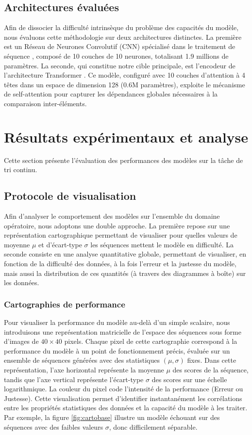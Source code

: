 \subsection{Architectures évaluées} 
Afin de dissocier la difficulté intrinsèque du problème des capacités du modèle, nous évaluons cette méthodologie sur deux architectures distinctes. La première est un Réseau de Neurones Convolutif (CNN) spécialisé dans le traitement de séquence \cite{kalchbrenner_neural_2017} , composé de 10 couches de 10 neurones, totalisant 1.9 millions de paramètres. La seconde, qui constitue notre cible principale, est l'encodeur de l'architecture Transformer \cite{vaswani_attention_2017}. Ce modèle, configuré avec 10 couches d'attention à 4 têtes dans un espace de dimension 128 (0.6M paramètres), exploite le mécanisme de self-attention pour capturer les dépendances globales nécessaires à la comparaison inter-éléments.

\section{Résultats expérimentaux et analyse}
Cette section présente l'évaluation des performances des modèles sur la tâche de tri continu. 

\subsection{Protocole de visualisation}
Afin d'analyser le comportement des modèles sur l'ensemble du domaine opératoire, nous adoptons une double approche. La première repose sur une représentation cartographique permettant de visualiser pour quelles valeurs de moyenne $\mu$ et d'écart-type $\sigma$ les séquences mettent le modèle en difficulté. La seconde consiste en une analyse quantitative globale, permettant de visualiser, en fonction de la difficulté des données, à la fois l'erreur et la justesse du modèle, mais aussi la distribution de ces quantités (à travers des diagrammes à boîte) sur les données.

\subsubsection{Cartographies de performance}
Pour visualiser la performance du modèle au-delà d'un simple scalaire, nous introduisons une représentation matricielle de l'espace des séquences sous forme d'images de $40 \times 40$ pixels. Chaque pixel de cette cartographie correspond à la performance du modèle à un point de fonctionnement précis, évaluée sur un ensemble de séquences générées avec des statistiques $(\mu, \sigma)$ fixes. Dans cette représentation, l'axe horizontal représente la moyenne $\mu$ des scores de la séquence, tandis que l'axe vertical représente l'écart-type $\sigma$ des scores sur une échelle logarithmique. La couleur du pixel code l'intensité de la performance (Erreur ou Justesse). Cette visualisation permet d'identifier instantanément les corrélations entre les propriétés statistiques des données et la capacité du modèle à les traiter. Par exemple, la figure \ref{fig:cartobase} illustre un modèle échouant sur des séquences avec des faibles valeurs $\sigma$, donc difficilement séparable.

